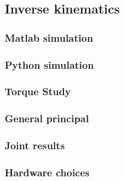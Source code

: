 \subsection{Inverse kinematics}
\subsubsection{Matlab simulation}

\subsubsection{Python simulation}

\subsubsection{Torque Study}
\subsubsection{General principal}

\subsubsection{Joint results}

\subsubsection{Hardware choices}
